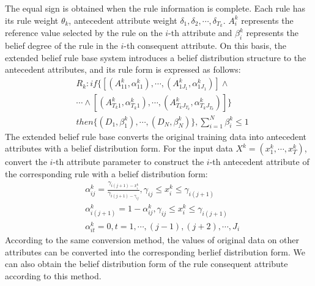 \documentclass{ieeeaccess}
\begin{document}
The equal sign is obtained when the rule information is complete. Each rule has its rule weight $\theta_k$, antecedent attribute weight $\delta_{1},\delta_{2},\cdots,\delta_{T_k}$.
$A_i^k$ represents the reference value selected by the rule on the $i$-th attribute and $\beta_i^k$ represents the belief degree of the rule in the $i$-th consequent attribute.
On this basis, the extended belief rule base system introduces a belief distribution structure to the antecedent attributes, and its rule form is expressed as follows:
\begin{equation}
    \begin{split}
        &R_k:if\{[(A_{11}^k,\alpha_{11}^k),\cdots,(A_{1J_1}^k,\alpha_{1J_1}^k)] \wedge \\
        &\cdots \wedge [(A_{T_k1}^k,\alpha_{T_k1}^k), \cdots,(A_{T_kJ_{T_k}}^k,\alpha_{T_kJ_{T_k}}^k)]\}\\
        &then\{(D_1,\beta_1^k),\cdots,(D_N,\beta_N^k)\},\sum_{i=1}^N\beta_i^k\leq1
    \end{split}
\end{equation}
The extended belief rule base converts the original training data into antecedent attributes with a belief distribution form.
For the input data $X^k=(x_1^k,\cdots,x_T^k)$, convert the $i$-th attribute parameter to construct the $i$-th antecedent attribute of the corresponding rule with a belief distribution form:
\begin{equation}
    \begin{split}
        &\alpha_{ij}^k=\frac{\gamma_{i(j+1)-x_i^k}}{\gamma_{i(j+1)-\gamma_{ij}}},\gamma_{ij}\leq x_i^k\leq \gamma_{i(j+1)}\\
        &\alpha_{i(j+1)}^k=1-\alpha_{ij}^k,\gamma_{ij}\leq x_i^k\leq \gamma_{i(j+1)} \\
        &\alpha_{it}^k=0,t=1,\cdots,(j-1),(j+2),\cdots,J_i
    \end{split}
\end{equation}
According to the same conversion method, the values of original data on other attributes can be converted into the corresponding berlief distribution form.
We can also obtain the belief distribution form of the rule consequent attribute according to this method.
\end{document}
